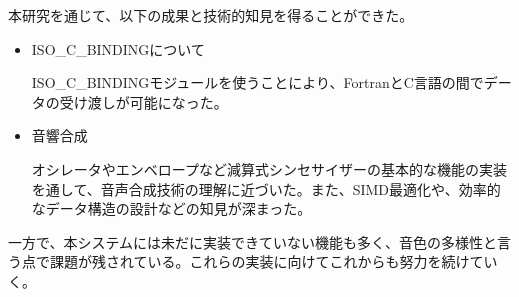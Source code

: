 \documentclass[dvipdfmx]{ujarticle}
\begin{document}
本研究を通じて、以下の成果と技術的知見を得ることができた。
\begin{itemize}
\item ISO\_C\_BINDINGについて\par
  ISO\_C\_BINDINGモジュールを使うことにより、FortranとC言語の間でデータの受け渡しが可能になった。
\item 音響合成\par
  オシレータやエンベロープなど減算式シンセサイザーの基本的な機能の実装を通して、音声合成技術の理解に近づいた。また、SIMD最適化や、効率的なデータ構造の設計などの知見が深まった。
\end{itemize}
一方で、本システムには未だに実装できていない機能も多く、音色の多様性と言う点で課題が残されている。これらの実装に向けてこれからも努力を続けていく。
\end{document}
